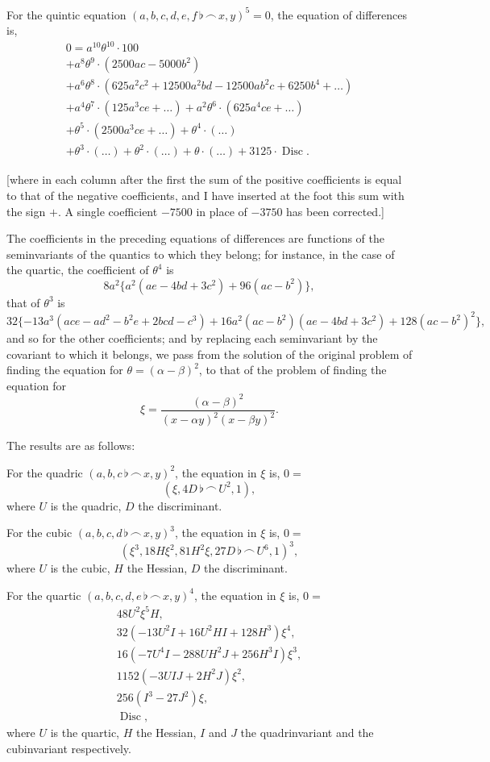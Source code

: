 \documentclass[11pt,a4paper]{article}
\theoremstyle{definition}
\DeclareMathOperator{\Disc}{Disc}
\begin{document}
For the quintic equation $(a,b,c,d,e,f\,\flat\,\frown\, x,y)^5=0$, the equation of differences is,
\begin{multline*}
0=a^{10}\theta^{10}\cdot100\\
+a^8\theta^9\cdot(2500ac-5000b^2)\\
+a^6\theta^8\cdot(625a^2c^2+12500a^2bd-12500ab^2c+6250b^4+\ldots)\\
+a^4\theta^7\cdot(125a^3ce+\ldots)+a^2\theta^6\cdot(625a^4ce+\ldots)\\
+\theta^5\cdot(2500a^3ce+\ldots)+\theta^4\cdot(\ldots)\\
+\theta^3\cdot(\ldots)+\theta^2\cdot(\ldots)+\theta\cdot(\ldots)+3125\cdot\Disc.
\end{multline*}

[where in each column after the first the sum of the positive coefficients is equal to that of the negative coefficients, and I have inserted at the foot this sum with the sign $+$. A single coefficient $-7500$ in place of $-3750$ has been corrected.]

The coefficients in the preceding equations of differences are functions of the seminvariants of the quantics to which they belong; for instance, in the case of the quartic, the coefficient of $\theta^4$ is
\[
8a^2\{a^2(ae-4bd+3c^2)+96(ac-b^2)\},
\]
that of $\theta^3$ is
\[
32\{-13a^3(ace-ad^2-b^2e+2bcd-c^3)+16a^2(ac-b^2)(ae-4bd+3c^2)+128(ac-b^2)^2\},
\]
and so for the other coefficients; and by replacing each seminvariant by the covariant to which it belongs, we pass from the solution of the original problem of finding the equation for $\theta=(\alpha-\beta)^2$, to that of the problem of finding the equation for
\[
\xi=\frac{(\alpha-\beta)^2}{(x-\alpha y)^2(x-\beta y)^2}.
\]

The results are as follows:

For the quadric $(a,b,c\,\flat\,\frown\, x,y)^2$, the equation in $\xi$ is, $0=$
\[
(\xi,4D\,\flat\,\frown\, U^2,1),
\]
where $U$ is the quadric, $D$ the discriminant.

For the cubic $(a,b,c,d\,\flat\,\frown\, x,y)^3$, the equation in $\xi$ is, $0=$
\[
(\xi^3,18H\xi^2,81H^2\xi,27D\,\flat\,\frown\, U^6,1)^3,
\]
where $U$ is the cubic, $H$ the Hessian, $D$ the discriminant.

For the quartic $(a,b,c,d,e\,\flat\,\frown\, x,y)^4$, the equation in $\xi$ is, $0=$
\begin{multline*}
48U^2\xi^5H,\\
32(-13U^2I+16U^2HI+128H^3)\xi^4,\\
16(-7U^4I-288UH^2J+256H^3I)\xi^3,\\
1152(-3UIJ+2H^2J)\xi^2,\\
256(I^3-27J^2)\xi,\\
\Disc,
\end{multline*}
where $U$ is the quartic, $H$ the Hessian, $I$ and $J$ the quadrinvariant and the cubinvariant respectively.
\end{document}
